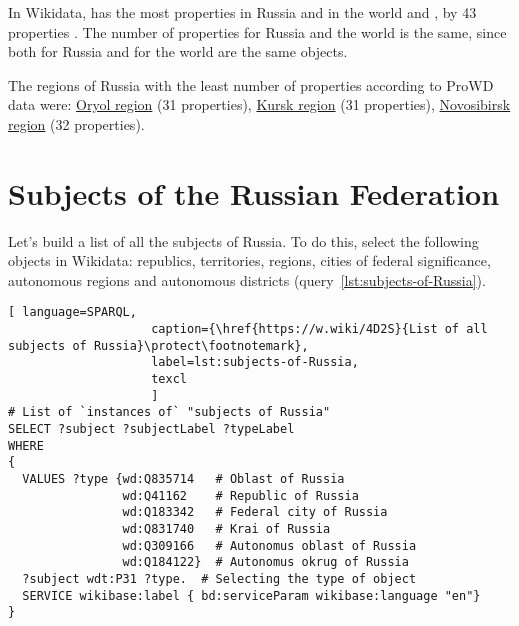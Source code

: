 In Wikidata, has the most properties in Russia and in the world  and , by 43 properties \autocite{Russia_prowd}. The number of properties for Russia and the world is the same, since both for Russia and for the world are the same objects.

The regions of Russia with the least number of properties according to ProWD data were: \href{http://www.wikidata.org/entity/Q3129 }{Oryol region} (31 properties), \href{http://www.wikidata.org/entity/Q3178 }{Kursk region} (31 properties), \href{http://www.wikidata.org/entity/Q5851 }{Novosibirsk region} (32 properties).

\section{Subjects of the Russian Federation}

Let's build a list of all the subjects of Russia. To do this, select the following objects in Wikidata: republics, territories, regions, cities of federal significance, autonomous regions and autonomous districts (query~\protect\ref{lst:subjects-of-Russia}).


\begin{lstlisting}[ language=SPARQL, 
                    caption={\href{https://w.wiki/4D2S}{List of all subjects of Russia}\protect\footnotemark},
                    label=lst:subjects-of-Russia,
                    texcl 
                    ]
# List of `instances of` "subjects of Russia" 
SELECT ?subject ?subjectLabel ?typeLabel
WHERE
{  
  VALUES ?type {wd:Q835714   # Oblast of Russia
                wd:Q41162    # Republic of Russia
                wd:Q183342   # Federal city of Russia
                wd:Q831740   # Krai of Russia
                wd:Q309166   # Autonomus oblast of Russia
                wd:Q184122}  # Autonomus okrug of Russia
  ?subject wdt:P31 ?type.  # Selecting the type of object
  SERVICE wikibase:label { bd:serviceParam wikibase:language "en"}
}
\end{lstlisting}%

